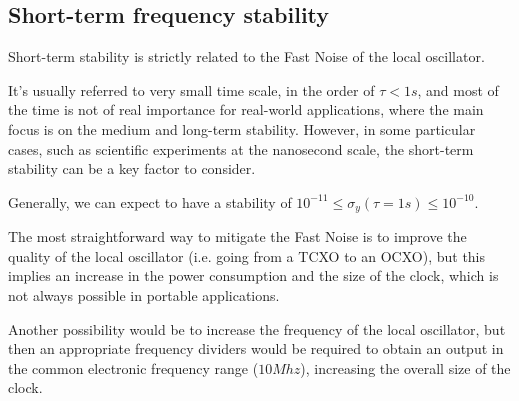 \subsection{Short-term frequency stability}
\label{subsec:short_term_stability}

Short-term stability is strictly related to the Fast Noise of the local oscillator.

It's usually referred to very small time scale, in the order of $\tau < 1s$, and most of the time is not of real importance for real-world applications, where the main focus is on the medium and long-term stability.
However, in some particular cases, such as scientific experiments at the nanosecond scale, the short-term stability can be a key factor to consider.

Generally, we can expect to have a stability of $10^{-11} \le \sigma_y(\tau=1s) \le 10^{-10}$.

The most straightforward way to mitigate the Fast Noise is to improve the quality of the local oscillator (i.e. going from a TCXO to an OCXO), but this implies an increase in the power consumption and the size of the clock, which is not always possible in portable applications.

Another possibility would be to increase the frequency of the local oscillator, but then an appropriate frequency dividers would be required to obtain an output in the common electronic frequency range ($10Mhz$), increasing the overall size of the clock.
